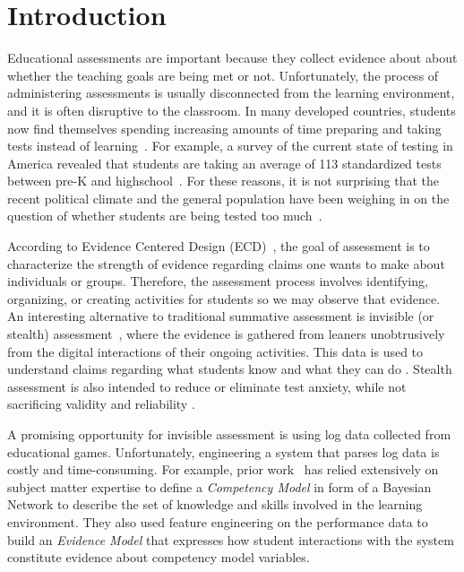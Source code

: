 \documentclass{sigchi}
\begin{document}
\section{Introduction}
Educational assessments are important because they collect evidence about about  whether  the teaching goals are being met or not.
Unfortunately, the process of  administering assessments is usually disconnected from the learning environment, and  it is often  disruptive to the classroom. 
In many developed countries, students now find themselves spending increasing amounts of time preparing and taking tests instead of learning~\cite{hofman2015rebalancing}.
For example, a  survey of the current state of testing in America revealed that students are taking an average of 113 standardized tests between pre-K and highschool~\cite{lazarin2014testing}. 
For these reasons, it is not surprising that the recent political climate and the general population have been weighing in on the question of whether students are being tested too much~\cite{lazarin2014testing}.


According to Evidence Centered Design (ECD)~\cite{mislevy2012design}, the goal of assessment is to characterize the strength of evidence regarding claims one wants to make about individuals or groups.
Therefore, the assessment process involves identifying, organizing, or creating activities for students so we may observe that evidence.
An interesting alternative to traditional summative assessment is invisible (or stealth) assessment~\cite{shute2013stealth},
where the evidence is gathered from leaners unobtrusively from the digital interactions of their ongoing activities.
This data is used  to understand claims regarding what students know and what they can do \cite{shute2009melding}.
Stealth assessment is also intended to reduce or eliminate test anxiety, while not sacrificing validity and reliability \cite{shute2008you}.



A promising opportunity for invisible assessment is using log data collected from educational games.
Unfortunately, engineering a system that parses log data is costly and time-consuming.
For example, prior work~\cite{shute2013stealth, shute2009melding} has relied extensively on subject matter expertise to define a \textit{Competency Model} in form of a Bayesian Network to describe the set of knowledge and skills involved in the learning environment.
They also used feature engineering on the performance data to build an \textit{Evidence Model} that expresses how student interactions with the system constitute evidence about competency model variables.
\end{document}
